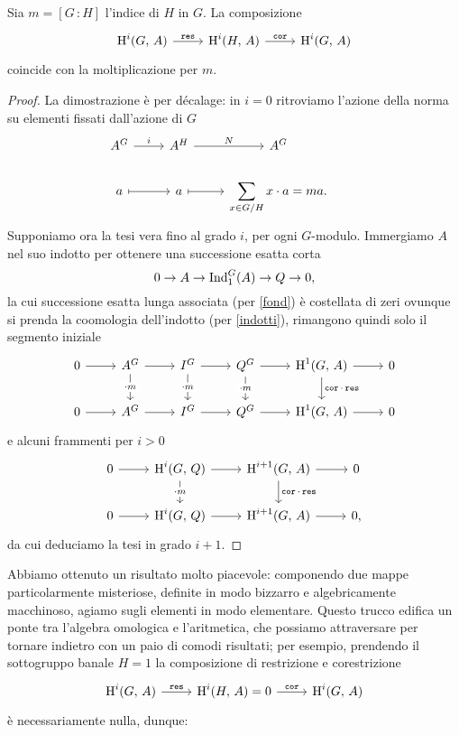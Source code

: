 \begin{theorem}
	Sia $ m = [G \,\colon H] $ l'indice di $ H $ in $ G $. La composizione
	\[\begin{tikzcd}
	\HH^i(G, \, A) \rar["\Res"] & \HH^i(H, \, A) \rar["\Cor"] & \HH^i(G, \, A)
	\end{tikzcd}  \]
	coincide con la moltiplicazione per $ m $.
\end{theorem}
\begin{proof}
	La dimostrazione è per décalage: in $ i = 0 $ ritroviamo l'azione della norma su elementi fissati dall'azione di $ G $
	\[\begin{tikzcd}
	A^G \rar["i"] & A^H \rar["N"] & A^G & \\
	a \rar[mapsto] & a \rar[mapsto] & \displaystyle\sum_{x \in G/H} x \cdot a = ma.
	\end{tikzcd}  \]
	Supponiamo ora la tesi vera fino al grado $ i $, per ogni $ G $-modulo. Immergiamo $ A $ nel suo indotto per ottenere una successione esatta corta
	\[ 0 \to A \to \operatorname{Ind}_1^G(A) \to Q \to 0, \]
	la cui successione esatta lunga associata (per \ref{fond}) è costellata di zeri ovunque si prenda la coomologia dell'indotto (per \ref{indotti}), rimangono quindi solo il segmento iniziale
	\[\begin{tikzcd}
	0 \rar
	& A^G \rar\dar["\cdot m" description]
	& I^G \rar\dar["\cdot m" description] 
	& Q^G \rar\dar["\cdot m" description] 
	& \HH^1(G, \, A) \rar\dar["\Cor \cdot \Res"] 
	& 0 \\
	0 \rar 
	& A^G \rar 
	& I^G \rar 
	& Q^G \rar 
	& \HH^1(G, \, A) \rar 
	& 0
	\end{tikzcd}\]
	e alcuni frammenti per $ i > 0 $
	\[\begin{tikzcd}
	0 \rar & \HH^i(G, \, Q) \rar\dar["\cdot m" description] & \HH^{i+1}(G, \, A) \rar\dar["\Cor \cdot \Res"] & 0 \\
	0 \rar & \HH^i(G, \, Q) \rar & \HH^{i+1}(G, \, A) \rar & 0,
	\end{tikzcd}\]
	da cui deduciamo la tesi in grado $ i+1 $.
\end{proof}

Abbiamo ottenuto un risultato molto piacevole: componendo due mappe particolarmente misteriose, definite in modo bizzarro e algebricamente macchinoso, agiamo sugli elementi in modo elementare. Questo trucco edifica un ponte tra l'algebra omologica e l'aritmetica, che possiamo attraversare per tornare indietro con un paio di comodi risultati; per esempio, prendendo il sottogruppo banale $ H = 1 $ la composizione di restrizione e corestrizione
\[\begin{tikzcd}
\HH^i(G, \, A) \rar["\Res"] & \HH^i(H, \, A) = 0 \rar["\Cor"] & \HH^i(G, \, A)
\end{tikzcd}  \]
è necessariamente nulla, dunque:


